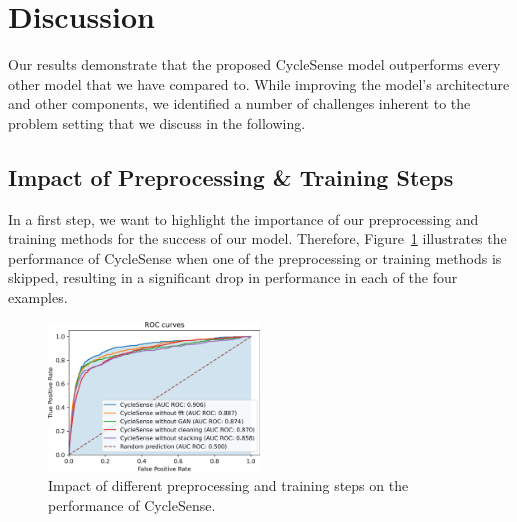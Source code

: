 \section{Discussion}
\label{sec:discussion_cyclesense}
Our results demonstrate that the proposed CycleSense model outperforms every other model that we have compared to.
While improving the model's architecture and other components, we identified a number of challenges inherent to the problem setting that we discuss in the following.


\subsection{Impact of Preprocessing \& Training Steps}
\label{subsec:impact_of_preprocessing_and_training_steps}
In a first step, we want to highlight the importance of our preprocessing and training methods for the success of our model.
Therefore, Figure~\ref{fig:impact} illustrates the performance of CycleSense when one of the preprocessing or training methods is skipped, resulting in a significant drop in performance in each of the four examples.

\begin{figure}[t]
	\centering
	\includegraphics[width=0.5\textwidth]{fig/impact.png}
	\caption{Impact of different preprocessing and training steps on the performance of CycleSense.}
	\label{fig:impact}
\end{figure}

